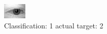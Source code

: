\begin{figure}[h!]
\begin{center}
\includegraphics[width=0.60\columnwidth]{figures/ID409_class_1_target_2.png}
\end{center}
\caption{ Classification: 1 actual target: 2}
\label{fig:ID409_class_1_target_2}
\end{figure}
